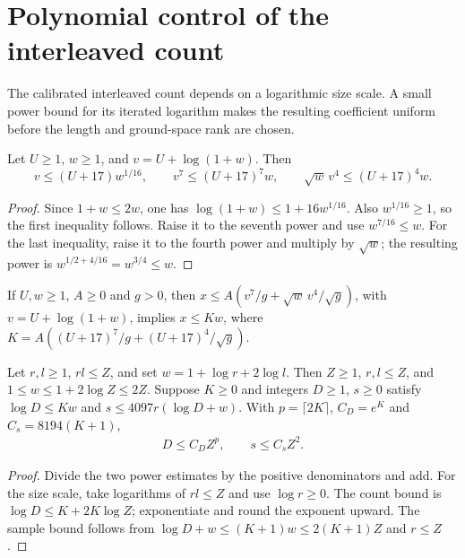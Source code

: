 \section{Polynomial control of the interleaved count}

The calibrated interleaved count depends on a logarithmic size scale.
A small power bound for its iterated logarithm makes the resulting
coefficient uniform before the length and ground-space rank are chosen.

\begin{lemma}
    \label{lem:interleaved_count_logarithmic_powers}
    \leanok
    Let $U\ge1$, $w\ge1$, and $v=U+\log(1+w)$. Then
    \[
        v\le(U+17)w^{1/16},\qquad
        v^7\le(U+17)^7w,\qquad
        \sqrt w\,v^4\le(U+17)^4w.
    \]
\end{lemma}
\begin{proof}\leanok
    Since $1+w\le2w$, one has
    $\log(1+w)\le1+16w^{1/16}$. Also $w^{1/16}\ge1$, so the first
    inequality follows. Raise it to the seventh power and use
    $w^{7/16}\le w$. For the last inequality, raise it to the fourth
    power and multiply by $\sqrt w$; the resulting power is
    $w^{1/2+4/16}=w^{3/4}\le w$.
\end{proof}


\begin{lemma}
    \label{lem:interleaved_count_sample_polynomial}
    \leanok
    If $U,w\ge1$, $A\ge0$ and $g>0$, then
    $x\le A(v^7/g+\sqrt w\,v^4/\sqrt g)$, with $v=U+\log(1+w)$, implies
    $x\le Kw$, where $K=A((U+17)^7/g+(U+17)^4/\sqrt g)$.

    Let $r,l\ge1$, $rl\le Z$, and set $w=1+\log r+2\log l$.
    Then $Z\ge1$, $r,l\le Z$, and
    $1\le w\le1+2\log Z\le2Z$.
    Suppose $K\ge0$ and integers $D\ge1$, $s\ge0$ satisfy
    $\log D\le Kw$ and $s\le4097r(\log D+w)$. With
    $p=\lceil2K\rceil$, $C_D=e^K$ and $C_s=8194(K+1)$,
    \begin{align}
        D\le C_DZ^p,\qquad s\le C_sZ^2.
        \label{eq:interleaved_count_sample_polynomial}
    \end{align}
\end{lemma}
\begin{proof}\leanok
    Divide the two power estimates by the positive denominators and add.
    For the size scale, take logarithms of $rl\le Z$ and use $\log r\ge0$.
    The count bound is $\log D\le K+2K\log Z$; exponentiate and round the
    exponent upward. The sample bound follows from
    $\log D+w\le(K+1)w\le2(K+1)Z$ and $r\le Z$.
\end{proof}

